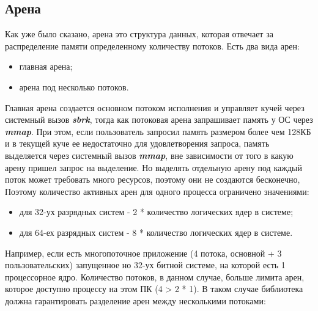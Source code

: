 \subsection{Арена}
Как уже было сказано, арена это структура данных, которая отвечает за распределение памяти определенному количеству потоков. Есть два вида арен:
\begin{itemize}
	\item главная арена;
	\item арена под несколько потоков.
\end{itemize}
Главная арена создается основном потоком исполнения и управляет кучей через системный вызов \textbf{\textit{sbrk}}, тогда как потоковая арена запрашивает память у ОС через \textbf{\textit{mmap}}. При этом, если пользователь запросил память размером более чем 128КБ и в текущей куче ее недостаточно для удовлетворения запроса, память выделяется через системный вызов \textbf{\textit{mmap}}, вне зависимости от того в какую арену пришел запрос на выделение. Но выделять отдельную арену под каждый поток может требовать много ресурсов, поэтому они не создаются бесконечно, Поэтому количество активных арен для одного процесса ограничено значениями:
\begin{itemize}
	\item для 32-ух разрядных систем - 2 * количество логических ядер в системе;
	\item для 64-ех разрядных систем - 8 * количество логических ядер в системе.
\end{itemize}
Например, если есть многопоточное приложение (4 потока, основной + 3 пользовательских) запущенное но 32-ух битной системе, на которой есть 1 процессорное ядро. Количество потоков, в данном случае, больше лимита арен, которое доступно процессу на этом ПК (4 > 2 * 1). В таком случае библиотека должна гарантировать разделение арен между несколькими потоками:
